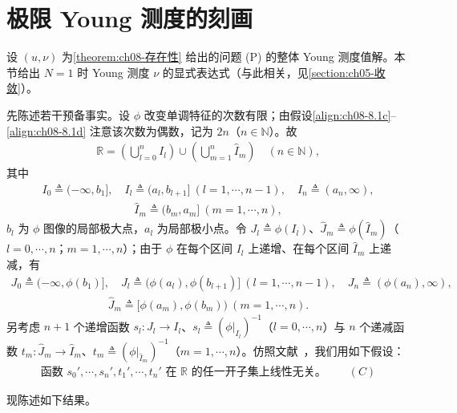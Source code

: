 \documentclass[../../main.tex]{subfiles}%
\begin{document}
\section{极限 Young 测度的刻画}\label{section:ch08-测度刻画}

设 $(u,\nu)$ 为\cref{theorem:ch08-存在性} 给出的问题 (P) 的整体 Young 测度值解。本节给出 $N=1$ 时 Young 测度 $\nu$ 的显式表达式（与此相关，见\cref{section:ch05-收敛}）。

先陈述若干预备事实。设 $\phi$ 改变单调特征的次数有限；由假设\eqref{align:ch08-8.1c}--\eqref{align:ch08-8.1d} 注意该次数为偶数，记为 $2n$（$n\in\mathbb{N}$）。故
\begin{align}
\mathbb{R}=\left(\bigcup_{l=0}^n I_l\right)\cup\left(\bigcup_{m=1}^n\widehat I_m\right)\quad(n\in\mathbb{N}), \label{align:ch08-8.96}
\end{align}
其中
\begin{align*}
I_0\triangleq (-\infty,b_1],\quad I_l\triangleq (a_l,b_{l+1}]\ (l=1,\cdots ,n-1),\quad I_n\triangleq (a_n,\infty),
\end{align*}
\begin{align*}
\widehat I_m\triangleq (b_m,a_m]\ (m=1,\cdots ,n),
\end{align*}
$b_l$ 为 $\phi$ 图像的局部极大点，$a_l$ 为局部极小点。令 $J_l\triangleq \phi(I_l)$、$\widehat J_m\triangleq \phi(\widehat I_m)$（$l=0,\cdots ,n$；$m=1,\cdots ,n$）；由于 $\phi$ 在每个区间 $I_l$ 上递增、在每个区间 $\widehat I_m$ 上递减，有
\begin{align*}
J_0\triangleq (-\infty,\phi(b_1)],\quad J_l\triangleq (\phi(a_l),\phi(b_{l+1})]\ (l=1,\cdots ,n-1),\quad J_n\triangleq (\phi(a_n),\infty),
\end{align*}
\begin{align*}
\widehat J_m\triangleq [\phi(a_m),\phi(b_m))\ (m=1,\cdots ,n).
\end{align*}
另考虑 $n+1$ 个递增函数 $s_l:J_l\to I_l$、$s_l\triangleq (\phi|_{I_l})^{-1}$（$l=0,\cdots ,n$）与 $n$ 个递减函数 $t_m:\widehat J_m\to\widehat I_m$、$t_m\triangleq (\phi|_{\widehat I_m})^{-1}$（$m=1,\cdots ,n$）。仿照文献~\cite{ref83}，我们用如下假设：
\begin{align*}
\text{函数 }s_0',\cdots ,s_n',t_1',\cdots ,t_n'\text{ 在 }\mathbb{R}\text{ 的任一开子集上线性无关。}
\qquad(C)
\end{align*}

现陈述如下结果。
\end{document}

